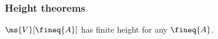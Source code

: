\documentclass{article}
\newcommand{\ale}{\sqsubseteq}
\newcommand{\expope}[2]{#1 \Rightarrow #2}
\newcommand{\lr}[2]{#2\mathrel{|}#1}
\newcommand{\lrcx}[3]{#1 \ent \lr{#2}{#3}}
\newcommand{\lrof}[1]{\ms{T}[#1]}
\newcommand{\Val}[1]{\ms{V}[#1]}
\begin{document}







\subsubsection{Height theorems}
\begin{theorem}\label{thm:finite-height}
  $\Val{\fineq{A}}$ has finite height for any $\fineq{A}$.
\end{theorem}
\end{document}
